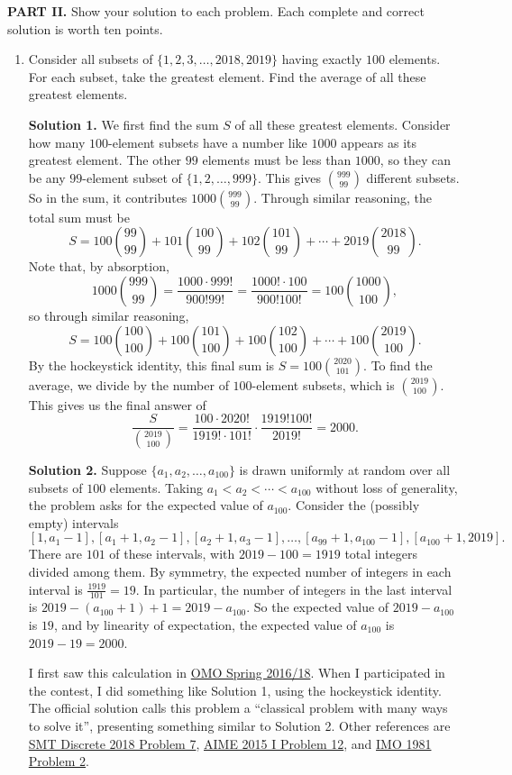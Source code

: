 \documentclass[11pt,paper=letter]{scrartcl}
\newcommand{\soln}[1]{{\sffamily \bfseries Solution #1.}\;}
\newcommand{\rem}[1]{{\small \sffamily \sansmath {\bfseries Remark.} #1}}
\begin{document}
\textbf{PART II.} Show your solution to each problem. Each complete and correct solution is worth ten points.

\begin{enumerate}[left=0pt]

\item Consider all subsets of $\{1,2, 3, \ldots, 2018, 2019\}$ having exactly $100$ elements. For each subset, take the greatest element. Find the average of all these greatest elements.

\soln1 We first find the sum $S$ of all these greatest elements. Consider how many $100$-element subsets have a number like $1000$ appears as its greatest element. The other $99$ elements must be less than $1000$, so they can be any $99$-element subset of $\{1,2, \ldots, 999\}$. This gives $\binom{999}{99}$ different subsets. So in the sum, it contributes $1000\binom{999}{99}$. Through similar reasoning, the total sum must be
\[
  S = 100\binom{99}{99} + 101\binom{100}{99} + 102\binom{101}{99} + \cdots + 2019\binom{2018}{99}.
\]
Note that, by absorption,
\[
  1000\binom{999}{99} = \frac{1000 \cdot 999!}{900! 99!} = \frac{1000! \cdot 100}{900! 100!} = 100\binom{1000}{100},
\]
so through similar reasoning,
\[
  S = 100\binom{100}{100} + 100\binom{101}{100} + 100\binom{102}{100} + \cdots + 100\binom{2019}{100}.
\]
By the hockeystick identity, this final sum is $S = 100\binom{2020}{101}$. To find the average, we divide by the number of $100$-element subsets, which is $\binom{2019}{100}$. This gives us the final answer of
\[
  \frac{S}{\binom{2019}{100}} = \frac{100 \cdot 2020!}{1919! \cdot 101!} \cdot \frac{1919! 100!}{2019!} = 2000.
\]

\soln2 Suppose $\{a_1, a_2, \ldots, a_{100}\}$ is drawn uniformly at random over all subsets of $100$ elements. Taking $a_1 < a_2 < \cdots < a_{100}$ without loss of generality, the problem asks for the expected value of $a_{100}$. Consider the (possibly empty) intervals
\[
  [1, a_1 - 1], [a_1 + 1, a_2 - 1], [a_2 + 1, a_3 - 1], \ldots, [a_{99} + 1, a_{100} - 1], [a_{100} + 1, 2019].
\]
There are $101$ of these intervals, with $2019 - 100 = 1919$ total integers divided among them. By symmetry, the expected number of integers in each interval is $\frac{1919}{101} = 19$. In particular, the number of integers in the last interval is $2019 - (a_{100} + 1) + 1 = 2019 - a_{100}$. So the expected value of $2019 - a_{100}$ is $19$, and by linearity of expectation, the expected value of $a_{100}$ is $2019 - 19 = 2000$.

\rem{I first saw this calculation in \href{http://internetolympiad.org/archive/OMOSpring16/OMOSpring16Solns.pdf}{OMO Spring 2016/18{}}. When I participated in the contest, I did something like Solution 1, using the hockeystick identity. The official solution calls this problem a ``classical problem with many ways to solve it'', presenting something similar to Solution 2. Other references are \href{https://sumo.stanford.edu/pdfs/smt2018/discrete-solutions.pdf}{SMT Discrete 2018 Problem 7{}}, \href{https://artofproblemsolving.com/wiki/index.php/2015_AIME_I_Problems/Problem_12}{AIME 2015 I Problem 12{}}, and \href{https://artofproblemsolving.com/wiki/index.php/1981_IMO_Problems/Problem_2}{IMO 1981 Problem 2}.}


\end{enumerate}
\end{document}
